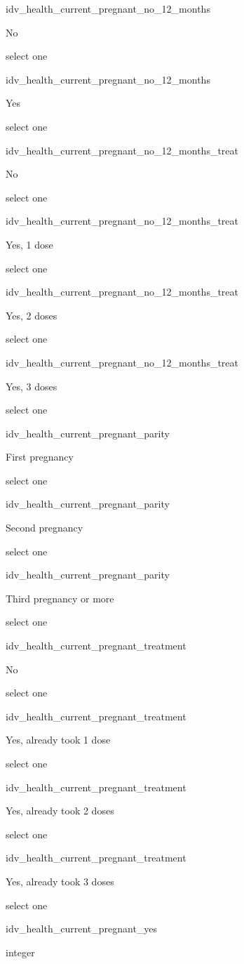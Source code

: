 \documentclass[]{article}
\begin{document}
idv\_health\_current\_pregnant\_no\_12\_months

No

select one

idv\_health\_current\_pregnant\_no\_12\_months

Yes

select one

idv\_health\_current\_pregnant\_no\_12\_months\_treat

No

select one

idv\_health\_current\_pregnant\_no\_12\_months\_treat

Yes, 1 dose

select one

idv\_health\_current\_pregnant\_no\_12\_months\_treat

Yes, 2 doses

select one

idv\_health\_current\_pregnant\_no\_12\_months\_treat

Yes, 3 doses

select one

idv\_health\_current\_pregnant\_parity

First pregnancy

select one

idv\_health\_current\_pregnant\_parity

Second pregnancy

select one

idv\_health\_current\_pregnant\_parity

Third pregnancy or more

select one

idv\_health\_current\_pregnant\_treatment

No

select one

idv\_health\_current\_pregnant\_treatment

Yes, already took 1 dose

select one

idv\_health\_current\_pregnant\_treatment

Yes, already took 2 doses

select one

idv\_health\_current\_pregnant\_treatment

Yes, already took 3 doses

select one

idv\_health\_current\_pregnant\_yes

integer
\end{document}

